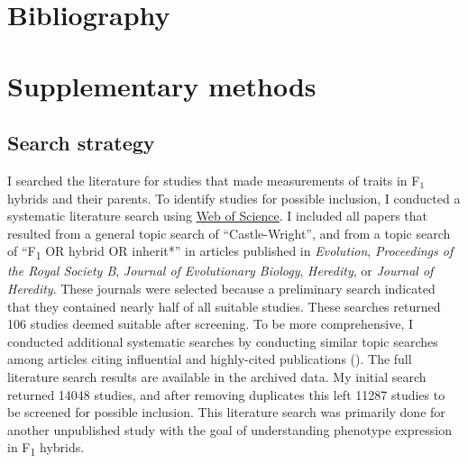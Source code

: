 \documentclass[times, twoside, watermark]{zHenriquesLab-StyleBioRxiv}
\begin{document}
\section*{Bibliography}

\onecolumn
\newpage


\captionsetup*{format=largeformat}
\section{Supplementary methods}\hypertarget{suppmeth}{}
\subsection{Search strategy}
I searched the literature for studies that made measurements of traits in F$_{1}$ hybrids and their parents. To identify studies for possible inclusion, I conducted a systematic literature search using \href{https://www.webofknowledge.com/}{Web of Science}. I included all papers that resulted from a general topic search of “Castle-Wright”, and from a topic search of “F\textsubscript{1} OR hybrid OR inherit*” in articles published in \textit{Evolution}, \textit{Proceedings of the Royal Society B}, \textit{Journal of Evolutionary Biology}, \textit{Heredity}, or \textit{Journal of Heredity}. These journals were selected because a preliminary search indicated that they contained nearly half of all suitable studies. These searches returned 106 studies deemed suitable after screening. To be more comprehensive, I conducted additional systematic searches by conducting similar topic searches among articles citing influential and highly-cited publications (\citealt{Dobzhansky1937, Hubbs1955, Mayr1963, Grant1981, Lande1981, Tave1986, Churchill1994, Bradshaw1998, Lynch1998, Hatfield1999, Schluter2000, Coyne2004}). The full literature search results are available in the archived data. My initial search returned 14048 studies, and after removing duplicates this left 11287 studies to be screened for possible inclusion. This literature search was primarily done for another unpublished study with the goal of understanding phenotype expression in F\textsubscript{1} hybrids.\par
\end{document}
